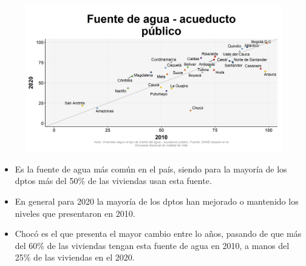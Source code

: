     \begin{figure}[H]
        \caption[Acueducto público como fuentes de agua por departamentos - 2010 VS 2020 ]{\label{cueducto_publico_dptos_vs} }
        \begin{center}
        \includegraphics[width=\textwidth,keepaspectratio]{img/var_129_scatter_time.png}
        \end{center}
    \end{figure}
            \begin{itemize}
                    \item Es la fuente de agua más común en el país, siendo para la mayoría de los dptos más del 50\% de las viviendas usan esta fuente.
                    \item En general para 2020 la mayoría de los dptos han mejorado o mantenido los niveles que presentaron en 2010.
                    \item Chocó es el que presenta el mayor cambio entre lo años, pasando de que más del 60\% de las viviendas tengan esta fuente de agua en 2010, a manos del 25\% de las viviendas en el 2020.
                    \end{itemize}

